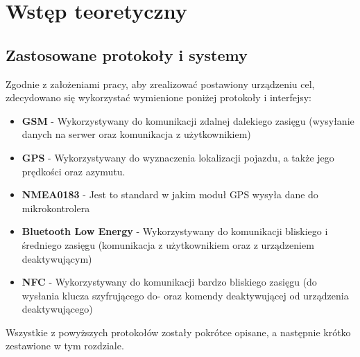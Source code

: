 \chapter{Wstęp teoretyczny}
\label{teorethical_introduction}

\section{Zastosowane protokoły i systemy}
Zgodnie z założeniami pracy, aby zrealizować postawiony urządzeniu cel, zdecydowano się wykorzystać wymienione poniżej protokoły i interfejsy:
\begin{itemize}
	\item \textbf{GSM} - Wykorzystywany do komunikacji zdalnej dalekiego zasięgu (wysyłanie danych na serwer oraz komunikacja z użytkownikiem)
	\item \textbf{GPS} - Wykorzystywany do wyznaczenia lokalizacji pojazdu, a także jego prędkości oraz azymutu.
	
	\item \textbf{NMEA0183} - Jest to standard w jakim moduł GPS wysyła dane do mikrokontrolera
	\item \textbf{Bluetooth Low Energy} - Wykorzystywany do komunikacji bliskiego i średniego zasięgu (komunikacja z użytkownikiem oraz z urządzeniem deaktywującym)
	\item \textbf{NFC} - Wykorzystywany do komunikacji bardzo bliskiego zasięgu (do wysłania klucza szyfrującego do- oraz komendy deaktywującej od urządzenia deaktywującego)
\end{itemize}

Wszystkie z powyższych protokołów zostały pokrótce opisane, a następnie krótko zestawione w tym rozdziale.

\clearpage










